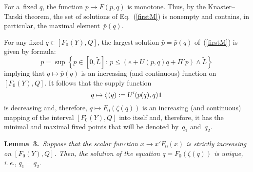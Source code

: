\begin{multicols}{2}
For a~fixed $q$, the function $p\to F(p,q)$ is monotone. Thus, by the 
Knaster--Tarski theorem, the set of solutions of Eq.~(\ref{firstM}) is nonempty 
and contains, in particular, the maximal element~$\bar p(q)$.

For any fixed $q\in [F_0(Y),Q]$, the largest solution $\bar p=\bar p(q)$ 
of~(\ref{firstM}) is given by formula:
$$
\bar p=\sup\left\{p\in [0,\tilde L]:\ p\le \left(e+U(p,q)q+\Pi'p\right)\wedge \tilde L\right\}
$$
implying that $q\mapsto \bar p(q)$ is an increasing (and continuous) function on 
$[F_0(Y),Q]$.  It follows that the supply function
$$
q\mapsto \zeta(q):=U'(\bar p(q),q){\bf 1}
$$
is decreasing and, therefore, $q\mapsto F_0(\zeta(q))$ is an increasing 
(and continuous) mapping of the interval  $[F_0(Y),Q]$ into itself and, 
therefore, it has  the minimal and maximal fixed points that will be denoted by~$q_1$ 
and~$q_2$.

\smallskip

\noindent
\textbf{Lemma~3.}\
\textit{Suppose that the scalar function $x\to x'F_0(x)$ is strictly increasing on 
$[F_0(Y),Q]$. Then, the
solution of the equation  $q=F_0(\zeta(q))$ is unique, i.\,e.}, $q_1=q_2$.

\smallskip


\end{multicols}
